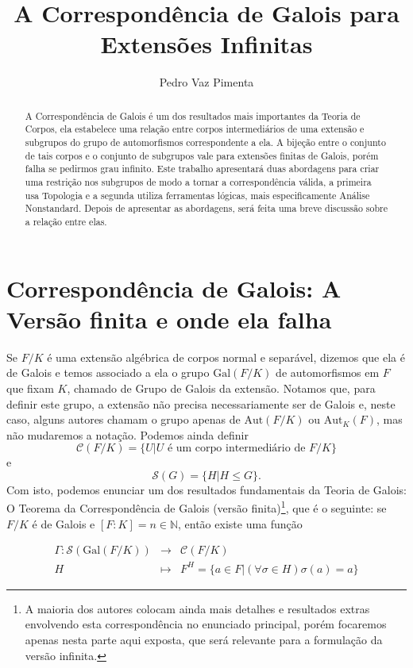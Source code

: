 \documentclass[12pt,a4paper]{article}
\title{A Correspondência de Galois para Extensões Infinitas}
\author{Pedro Vaz Pimenta}
\theoremstyle{definition}
\begin{document}
\maketitle

\begin{abstract}
    A Correspondência de Galois é um dos resultados mais importantes da Teoria de Corpos, ela estabelece uma relação entre corpos intermediários de uma extensão e subgrupos do grupo de automorfismos correspondente a ela. A bijeção entre o conjunto de tais corpos e o conjunto de subgrupos vale para extensões finitas de Galois, porém falha se pedirmos grau infinito. Este trabalho apresentará duas abordagens para criar uma restrição nos subgrupos de modo a tornar a correspondência válida, a primeira usa Topologia e a segunda utiliza ferramentas lógicas, mais especificamente Análise Nonstandard. Depois de apresentar as abordagens, será feita uma breve discussão sobre a relação entre elas.  
\end{abstract}

\section{Correspondência de Galois: A Versão finita e onde ela falha}

Se $F/K$ é uma extensão algébrica de corpos normal e separável, dizemos que ela é de Galois e temos associado a ela o grupo $\text{Gal}(F/K)$ de automorfismos em $F$ que fixam $K$, chamado de Grupo de Galois da extensão. Notamos que, para definir este grupo, a extensão não precisa necessariamente ser de Galois e, neste caso, alguns autores chamam o grupo apenas de $\text{Aut}(F/K)$ ou $\text{Aut}_K(F)$, mas não mudaremos a notação. Podemos ainda definir $$ \mathcal{C}(F/K)=\{ U | U \text{ é um corpo intermediário de } F/K \}$$ e $$\mathcal{S}(G)=\{ H | H\leq G \}.$$ Com isto, podemos enunciar um dos resultados fundamentais da Teoria de Galois: O Teorema da Correspondência de Galois (versão finita)\footnote{A maioria dos autores colocam ainda mais detalhes e resultados extras envolvendo esta correspondência no enunciado principal, porém focaremos apenas nesta parte aqui exposta, que será relevante para a formulação da versão infinita.}, que é o seguinte: se $F/K$ é de Galois e $[F : K]=n\in \mathbb{N}$, então existe uma função 

$$\begin{array}{rcl}
   \Gamma: \mathcal{S}(\text{Gal}(F/K))  & \rightarrow & \mathcal{C}(F/K)  \\
     H & \mapsto & F^H = \{ a\in F |(\forall \sigma\in H) \sigma (a)=a \} 
\end{array}$$
\end{document}
